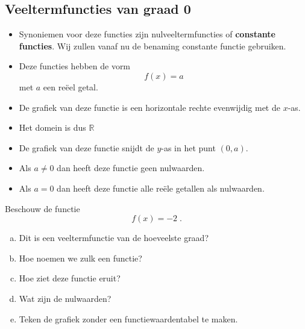 \documentclass[12pt]{article}
\begin{document}
\begin{theorie}
\pagebreak
\subsection{Veeltermfuncties van graad 0}

\begin{itemize}
\item Synoniemen voor deze functies zijn nulveeltermfuncties of {\bf constante functies}. Wij zullen vanaf nu de benaming constante functie gebruiken.
\item Deze functies hebben de vorm
  $$f(x) = a$$
  met $a$ een reëel getal.
\item De grafiek van deze functie is een horizontale rechte evenwijdig met de $x$-as.
\item Het domein is dus $\mathbb{R}$
\item De grafiek van deze functie snijdt de $y$-as in het punt $(0, a)$.
\item Als $a\neq 0$ dan heeft deze functie geen nulwaarden.
\item Als $a=0$ dan heeft deze functie alle reële getallen als nulwaarden.
\end{itemize}

\end{theorie}

\begin{oefening}
  Beschouw de functie
  $$f(x)=-2\;.$$
  \begin{enumerate}[(a)]
  \item Dit is een veeltermfunctie van de hoeveelste graad?
  \item Hoe noemen we zulk een functie?
  \item Hoe ziet deze functie eruit?
  \item Wat zijn de nulwaarden?
  \item Teken de grafiek zonder een functiewaardentabel te maken.
  \end{enumerate}
\end{oefening}
\end{document}
